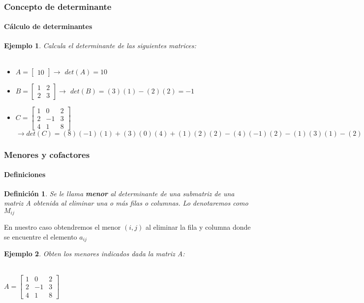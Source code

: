\documentclass[11pt]{beamer}
\newtheorem{defi}{Definición}
\newtheorem{ejem}{Ejemplo}
\begin{document}
\begin{frame}
\frametitle{Concepto de determinante}
\framesubtitle{Cálculo de determinantes}
\begin{ejem}
Calcula el determinante de las siguientes matrices:\\ \hspace{0cm} \\
\begin{itemize}
\item ${\displaystyle A = {\begin{bmatrix}10\end{bmatrix}}}\rightarrow$ $det(A)=10$
\item ${\displaystyle B = {\begin{bmatrix}1&2\\2&3\end{bmatrix}}}\rightarrow$ $det(B)=(3)(1)-(2)(2)=-1$
\item ${\displaystyle C = {\begin{bmatrix}1&0&2\\2&-1&3\\4&1&8\end{bmatrix}}}$\\ 
$\rightarrow det(C) = (8)(-1)(1)+(3)(0)(4)+(1)(2)(2)-(4)(-1)(2)-(1)(3)(1)-(2)(0)(8) = 1$
\end{itemize}
\end{ejem}
\end{frame}

\begin{frame}
\frametitle{Menores y cofactores}
\framesubtitle{Definiciones}
\begin{defi}
Se le llama \textbf{menor} al determinante de una submatriz de una matriz A obtenida al eliminar una o más filas o columnas. Lo denotaremos como $M_{ij}$
\end{defi}
En nuestro caso obtendremos el menor $(i,j)$ al eliminar la fila y columna donde se encuentre el elemento $a_{ij}$
\begin{ejem}
Obten los menores indicados dada la matriz A: \\ \hspace{0cm} \\
\begin{center}
${\displaystyle A = {\begin{bmatrix}1&0&2\\2&-1&3\\4&1&8\end{bmatrix}}}$
\end{center}
\end{ejem}
\end{frame}
\end{document}
